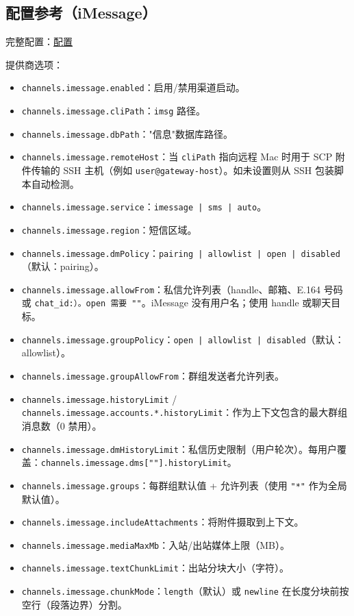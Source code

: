 \subsection{配置参考（iMessage）}


完整配置：\href{/gateway/configuration}{配置}

提供商选项：

\begin{itemize}
  \item \texttt{channels.imessage.enabled}：启用/禁用渠道启动。
  \item \texttt{channels.imessage.cliPath}：\texttt{imsg} 路径。
  \item \texttt{channels.imessage.dbPath}："信息"数据库路径。
  \item \texttt{channels.imessage.remoteHost}：当 \texttt{cliPath} 指向远程 Mac 时用于 SCP 附件传输的 SSH 主机（例如 \texttt{user@gateway-host}）。如未设置则从 SSH 包装脚本自动检测。
  \item \texttt{channels.imessage.service}：\texttt{imessage | sms | auto}。
  \item \texttt{channels.imessage.region}：短信区域。
  \item \texttt{channels.imessage.dmPolicy}：\texttt{pairing | allowlist | open | disabled}（默认：pairing）。
  \item \texttt{channels.imessage.allowFrom}：私信允许列表（handle、邮箱、E.164 号码或 \texttt{chat\_id:\textit{}）。\texttt{open} 需要 \texttt{"}"}。iMessage 没有用户名；使用 handle 或聊天目标。
  \item \texttt{channels.imessage.groupPolicy}：\texttt{open | allowlist | disabled}（默认：allowlist）。
  \item \texttt{channels.imessage.groupAllowFrom}：群组发送者允许列表。
  \item \texttt{channels.imessage.historyLimit} / \texttt{channels.imessage.accounts.*.historyLimit}：作为上下文包含的最大群组消息数（0 禁用）。
  \item \texttt{channels.imessage.dmHistoryLimit}：私信历史限制（用户轮次）。每用户覆盖：\texttt{channels.imessage.dms[""].historyLimit}。
  \item \texttt{channels.imessage.groups}：每群组默认值 + 允许列表（使用 \texttt{"*"} 作为全局默认值）。
  \item \texttt{channels.imessage.includeAttachments}：将附件摄取到上下文。
  \item \texttt{channels.imessage.mediaMaxMb}：入站/出站媒体上限（MB）。
  \item \texttt{channels.imessage.textChunkLimit}：出站分块大小（字符）。
  \item \texttt{channels.imessage.chunkMode}：\texttt{length}（默认）或 \texttt{newline} 在长度分块前按空行（段落边界）分割。
\end{itemize}


